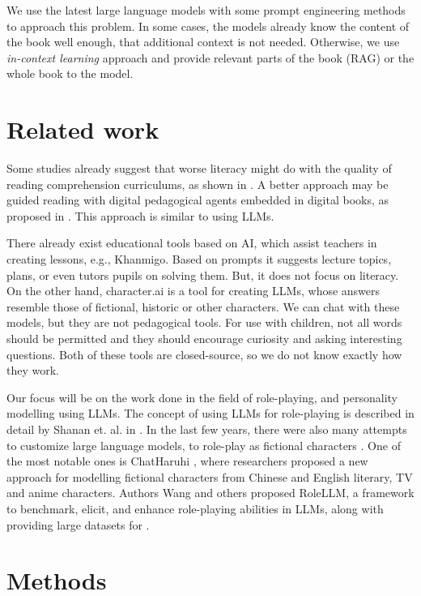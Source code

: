 \documentclass[fleqn,moreauthors,10pt]{ds_report}
\begin{document}
We use the latest large language models with some prompt engineering methods to approach
this problem. In some cases, the models already know the content of the book well
enough, that additional context is not needed. Otherwise, we use \emph{in-context
learning} approach and provide relevant parts of the book (RAG) or the whole book to
the model.

\section*{Related work}

Some studies already suggest that worse literacy might do with the
quality of reading comprehension curriculums, as shown in
\cite{bogaerds-hazenberg_what_2022}. A better approach may be guided 
reading with digital pedagogical agents embedded in digital books,
as proposed in \cite{nielen_digital_2018}. This approach is similar
to using LLMs.

There already exist educational tools based on AI, which assist teachers
in creating lessons, e.g., Khanmigo. Based on prompts it suggests lecture
topics, plans, or even tutors pupils on solving them. But, it does not
focus on literacy. On the other hand, character.ai is a tool for creating
LLMs, whose answers resemble those of fictional, historic or other
characters. We can chat with these models, but they are not pedagogical
tools. For use with children, not all words should be permitted and
they should encourage curiosity and asking interesting questions. Both
of these tools are closed-source, so we do not know exactly how they
work.

Our focus will be on the work done in the field of role-playing, and personality modelling using LLMs. The concept of using LLMs for role-playing is described in detail by Shanan et. al. in \cite{shanahan_role-play_2023}. 
In the last few years, there were also many attempts to customize large language models, to role-play as fictional characters \cite{li_chatharuhi_2023, wang_incharacter_2024, shao_character-llm_2023, wang_rolellm_2023, chen_large_2023}. One of the most notable ones is ChatHaruhi \cite{li_chatharuhi_2023}, where researchers proposed a new approach for modelling fictional characters from Chinese and English literary, TV and anime characters. Authors Wang and others proposed RoleLLM, a framework to benchmark, elicit,
and enhance role-playing abilities in LLMs, along with providing large datasets for \cite{wang_rolellm_2023}.

\section*{Methods}
\end{document}
